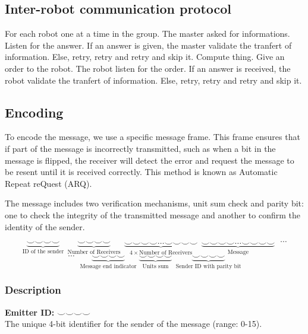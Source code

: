 \documentclass[main.tex]{subfiles}
\begin{document}
\subsection{Inter-robot communication protocol}
For each robot one at a time in the group.
The master asked for informations.
Listen for the answer.
If an answer is given, the master validate the tranfert of information.
Else, retry, retry and retry and skip it.
Compute thing.
Give an order to the robot.
The robot listen for the order.
If an answer is received, the robot validate the tranfert of information.
Else, retry, retry and retry and skip it.

\subsection{Encoding}

To encode the message, we use a specific message frame. This frame ensures that if part of the message is incorrectly transmitted, such as when a bit in the message is flipped, the receiver will detect the error and request the message to be resent until it is received correctly. This method is known as Automatic Repeat reQuest (ARQ).

The message includes two verification mechanisms, unit sum check and parity bit: one to check the integrity of the transmitted message and another to confirm the identity of the sender.

$$
\underbrace{\smallsmile \smallsmile \smallsmile \smallsmile}_{\text{ID of the sender}}~~
\underbrace{\smallsmile \smallsmile \smallsmile \smallsmile}_{\text{Number of Receivers}}~~
\underbrace{\smallsmile \smallsmile \smallsmile \smallsmile \dots \smallsmile \smallsmile \smallsmile \smallsmile}_{4 \times \text{Number of Receivers}}~~
\underbrace{\smallsmile \smallsmile \smallsmile \smallsmile \dots \smallsmile \smallsmile \smallsmile \smallsmile}_{\text{Message}}
~~~ \cdots
$$
$$
\cdots ~~~
\underbrace{\smallsmile \smallsmile \smallsmile \smallsmile}_{\text{Message end indicator}}\;
\underbrace{\smallsmile \smallsmile \smallsmile \smallsmile}_{\text{Units sum}}~~
\underbrace{\smallsmile \smallsmile \smallsmile \smallsmile}_{\text{Sender ID with parity bit}}
$$

\subsubsection{Description}

\textbf{Emitter ID:} $\smallsmile \smallsmile \smallsmile \smallsmile$\\
The unique 4-bit identifier for the sender of the message (range: 0-15).\\
\end{document}
